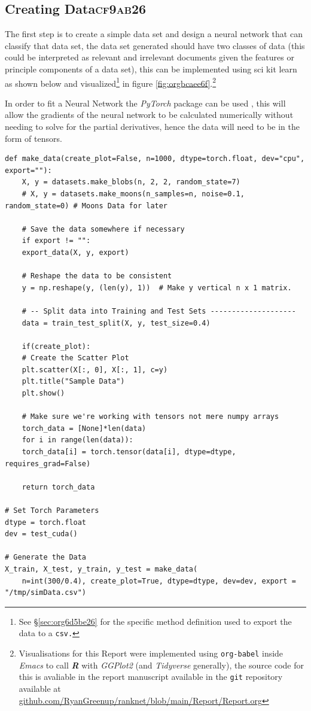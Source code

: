 \documentclass[a4paper,11pt,twoside]{article}
\begin{document}
\subsection{Creating Data\hfill{}\textsc{cf9ab26}}
\label{sec:org8fe06be}
The first step is to create a simple data set and design a neural
network that can classify that data set, the data set generated
should have two classes of data (this could be interpreted as
relevant and irrelevant documents given the features or principle
components of a data set), this can be implemented using sci kit
learn as shown below and visualized\footnote{See \S \ref{sec:org6d5be26} for the specific method definition used to
export the data to a \texttt{csv.}} in figure \ref{fig:orgbcaee6f}.\footnote{Visualisations for this Report were implemented using
\texttt{org-babel} \cite{dominikOrgModeReference2018} inside \emph{Emacs}
\cite{stallmanGNUEmacsManual2002} to call \textbf{\emph{R}}
\cite{rcoreteamLanguageEnvironmentStatistical2021} with \emph{GGPlot2}
\cite{wickhamGgplot2ElegantGraphics2016a} (and \emph{Tidyverse}
\cite{wickhamWelcomeTidyverse2019} generally), the source code for this
is avaliable in the report manuscript available in the \texttt{git} repository
available at \href{https://github.com/RyanGreenup/ranknet/blob/main/Report/Report.org}{github.com/RyanGreenup/ranknet/blob/main/Report/Report.org}\label{orgcbb1978}}


In order to fit a Neural Network the \emph{PyTorch} package can be used
\cite{NEURIPS2019_9015}, this will allow the gradients of the neural
network to be calculated numerically without needing to solve for
the partial derivatives, hence the data will need to be in the
form of tensors.

\begin{verbatim}
def make_data(create_plot=False, n=1000, dtype=torch.float, dev="cpu", export=""):
    X, y = datasets.make_blobs(n, 2, 2, random_state=7)
    # X, y = datasets.make_moons(n_samples=n, noise=0.1, random_state=0) # Moons Data for later

    # Save the data somewhere if necessary
    if export != "":
	export_data(X, y, export)

    # Reshape the data to be consistent
    y = np.reshape(y, (len(y), 1))  # Make y vertical n x 1 matrix.

    # -- Split data into Training and Test Sets --------------------
    data = train_test_split(X, y, test_size=0.4)

    if(create_plot):
	# Create the Scatter Plot
	plt.scatter(X[:, 0], X[:, 1], c=y)
	plt.title("Sample Data")
	plt.show()

    # Make sure we're working with tensors not mere numpy arrays
    torch_data = [None]*len(data)
    for i in range(len(data)):
	torch_data[i] = torch.tensor(data[i], dtype=dtype, requires_grad=False)

    return torch_data

# Set Torch Parameters
dtype = torch.float
dev = test_cuda()

# Generate the Data
X_train, X_test, y_train, y_test = make_data(
    n=int(300/0.4), create_plot=True, dtype=dtype, dev=dev, export = "/tmp/simData.csv")
\end{verbatim}
\end{document}
